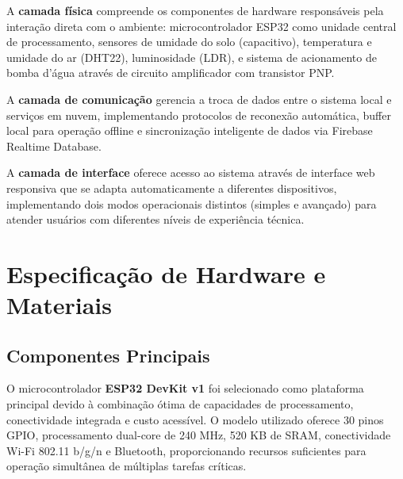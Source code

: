 \documentclass[twoside,english,brazilian]{UNISINOSmonografia}
\begin{document}

A \textbf{camada física} compreende os componentes de hardware responsáveis pela interação direta com o ambiente: microcontrolador ESP32 como unidade central de processamento, sensores de umidade do solo (capacitivo), temperatura e umidade do ar (DHT22), luminosidade (LDR), e sistema de acionamento de bomba d'água através de circuito amplificador com transistor PNP.

A \textbf{camada de comunicação} gerencia a troca de dados entre o sistema local e serviços em nuvem, implementando protocolos de reconexão automática, buffer local para operação offline e sincronização inteligente de dados via Firebase Realtime Database.

A \textbf{camada de interface} oferece acesso ao sistema através de interface web responsiva que se adapta automaticamente a diferentes dispositivos, implementando dois modos operacionais distintos (simples e avançado) para atender usuários com diferentes níveis de experiência técnica.


\section{Especificação de Hardware e Materiais}

\subsection{Componentes Principais}

O microcontrolador \textbf{ESP32 DevKit v1} foi selecionado como plataforma principal devido à combinação ótima de capacidades de processamento, conectividade integrada e custo acessível. O modelo utilizado oferece 30 pinos GPIO, processamento dual-core de 240 MHz, 520 KB de SRAM, conectividade Wi-Fi 802.11 b/g/n e Bluetooth, proporcionando recursos suficientes para operação simultânea de múltiplas tarefas críticas.
\end{document}
